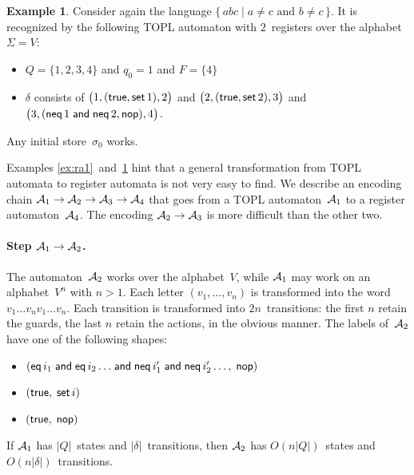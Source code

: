 \documentclass[9pt, preprint]{sigplanconf} %
\theoremstyle{definition}
\newtheorem{example}{Example}
\theoremstyle{remark}
\begin{document}
\begin{example}\label{ex:topl1}
Consider again the language $\{\,abc\mid\text{$a\ne c$ and $b\ne c$}\,\}$.
It is recognized by the following TOPL automaton with $2$~registers over the alphabet $\Sigma=V$:
\begin{itemize}
\item $Q=\{1,2,3,4\}$ and $q_0=1$ and $F=\{4\}$
\item $\delta$ consists of
  $\bigl(1,({\sf true}, {\sf set}\,1),2\bigr)$
  and $\bigl(2,({\sf true}, {\sf set}\,2),3\bigr)$
  and $\bigl(3,({\sf neq}\,1\mathrel{\sf and}{\sf neq}\,2, {\sf nop}),4\bigr)$.
\end{itemize}
Any initial store~$\sigma_0$ works.
\end{example}

Examples \ref{ex:ra1}~and~\ref{ex:topl1} hint that a general  transformation from TOPL automata to register automata is not very easy to find.
We describe an encoding chain ${\cal A}_1\to{\cal A}_2\to{\cal A}_3\to{\cal A}_4$ that goes from a TOPL automaton~${\cal A}_1$ to a register automaton~${\cal A}_4$.
The encoding ${\cal A}_2\to{\cal A}_3$ is more difficult than the other two.

\paragraph{Step ${\cal A}_1\to{\cal A}_2$.}
The automaton~${\cal A}_2$ works over the alphabet~$V$, while ${\cal A}_1$ may work on an alphabet~$V^n$ with $n>1$.
Each letter $(v_1,\ldots,v_n)$ is transformed into the word $v_1\ldots v_n v_1\ldots v_n$.
Each transition is transformed into $2n$~transitions: the first $n$ retain the guards, the last $n$ retain the actions, in the obvious manner.
The labels of~${\cal A}_2$ have one of the following shapes:
\begin{itemize}
\item $({\sf eq}\,i_1\mathrel{\sf and}{\sf eq}\,i_2\ldots
  \mathrel{\sf and}{\sf neq}\,i'_1\mathrel{\sf and}{\sf neq}\,i'_2\ldots,\;
  {\sf nop})$
\item $({\sf true},\;{\sf set}\,i)$
\item $({\sf true},\;{\sf nop})$
\end{itemize}
If ${\cal A}_1$ has $|Q|$~states and $|\delta|$~transitions, then ${\cal A}_2$ has $O(n|Q|)$~states and $O(n|\delta|)$~transitions.
\end{document}
